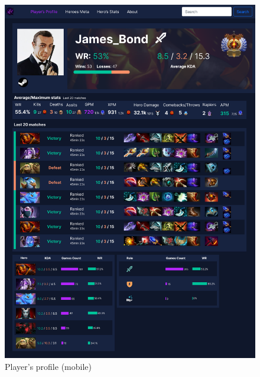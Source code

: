     \begin{figure}[ht]
        \centering
        \begin{minipage}[t]{0.48\textwidth}
            \centering
            \includegraphics[width=\textwidth]{images/PlayerProfile_m}
            \caption{Player's profile (mobile)}
        \end{minipage}
        \hfill
        \begin{minipage}[t]{0.48\textwidth}
            \centering

\end{minipage}
\end{figure}
